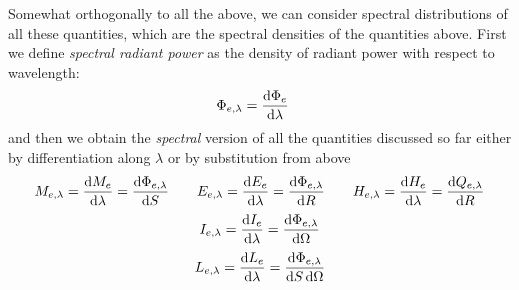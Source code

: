 Somewhat orthogonally to all the above, we can consider spectral distributions
of all these quantities, which are the spectral densities of the
quantities above. First we define \textsl{spectral radiant power} as the density of
radiant power with respect to wavelength:
\begin{displaymath}
	\Phi_{e,\lambda} = \frac{\mathop{}\!\mathrm{d}\Phi_e}{\mathop{}\!\mathrm{d}\lambda} \quad
\end{displaymath}
and then we obtain the \textsl{spectral} version of all the quantities discussed so far
either by differentiation along $\lambda$ or by substitution from above
\begin{displaymath}
	M_{e,\lambda} = \frac{\d M_e}{\d\lambda} = \frac{\d\Phi_{e,\lambda}}{\d S} \qquad
	E_{e,\lambda} = \frac{\d E_e}{\d\lambda} = \frac{\d\Phi_{e,\lambda}}{\d R} \qquad
	H_{e,\lambda} = \frac{\d H_e}{\d\lambda} = \frac{\d Q_{e,\lambda}}{\d R} 
\end{displaymath}
\begin{displaymath}
	I_{e,\lambda} = \frac{\mathop{}\!\mathrm{d} I_e}{\mathop{}\!\mathrm{d}\lambda} = \frac{\mathop{}\!\mathrm{d}\Phi_{e,\lambda}}{\mathop{}\!\mathrm{d}\Omega} 
\end{displaymath}
\begin{displaymath}
	L_{e,\lambda} = \frac{\mathop{}\!\mathrm{d} L_e}{\mathop{}\!\mathrm{d}\lambda} = \frac{\mathop{}\!\mathrm{d}\Phi_{e,\lambda}}{\mathop{}\!\mathrm{d} S \mathop{}\!\mathrm{d}\Omega} 
\end{displaymath}



